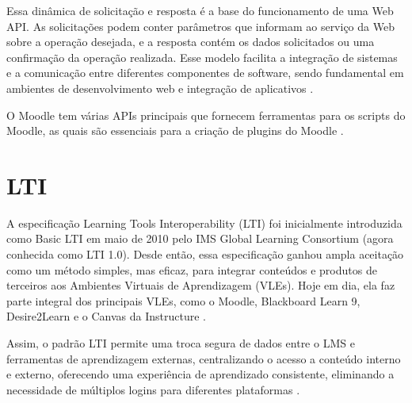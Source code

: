 Essa dinâmica de solicitação e resposta é a base do funcionamento de uma Web API. As solicitações podem conter parâmetros que informam ao serviço da Web sobre a operação desejada, e a resposta contém os dados solicitados ou uma confirmação da operação realizada. Esse modelo facilita a integração de sistemas e a comunicação entre diferentes componentes de software, sendo fundamental em ambientes de desenvolvimento web e integração de aplicativos \cite[p.~20-23]{richardson}.

O Moodle tem várias APIs principais que fornecem ferramentas para os scripts do Moodle, as quais são essenciais para a criação de plugins do Moodle \cite{moodle}.

\section{LTI}

A especificação Learning Tools Interoperability (LTI) foi inicialmente introduzida como Basic LTI em maio de 2010 pelo IMS Global Learning Consortium (agora conhecida como LTI 1.0). Desde então, essa especificação ganhou ampla aceitação como um método simples, mas eficaz, para integrar conteúdos e produtos de terceiros aos Ambientes Virtuais de Aprendizagem (VLEs). Hoje em dia, ela faz parte integral dos principais VLEs, como o Moodle, Blackboard Learn 9, Desire2Learn e o Canvas da Instructure \cite[p.4]{vickers}.

Assim, o padrão LTI permite uma troca segura de dados entre o LMS e ferramentas de aprendizagem externas, centralizando o acesso a conteúdo interno e externo, oferecendo uma experiência de aprendizado consistente, eliminando a necessidade de múltiplos logins para diferentes plataformas \cite{verdaguer}.
